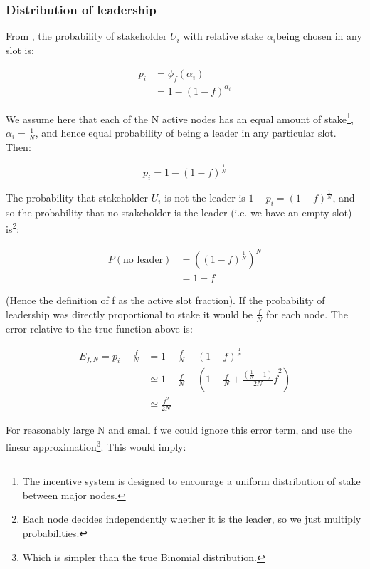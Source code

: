\documentclass[11pt,a4paper]{article}
\begin{document}
\subsubsection{Distribution of leadership}
\label{distribution-of-leadership}

From \cite{BGKR17}, the probability of stakeholder $U_i$
with relative stake $\alpha_{i}$being chosen in any slot is:

\begin{align*}
p_{i} &= \phi_{f}(\alpha_{i}) \\
      &= 1 - (1 - f)^{\alpha_{i}}
\end{align*}

We assume here that each of the N active nodes has an equal amount of
stake\footnote{The incentive system is designed to encourage a uniform
 distribution of stake between major nodes.},
$\alpha_{i} = \frac{1}{N}$, and hence equal probability of being a
leader in any particular slot. Then:

\begin{equation*}
p_i = 1 - (1 - f)^\frac{1}{N}
\end{equation*}

The probability that stakeholder $U_i$ is not the leader is
$1 - p_{i} = (1 - f)^\frac{1}{N}$, and so the
probability that no stakeholder is the leader (i.e. we have an empty
slot) is\footnote{Each node decides independently whether it is the
  leader, so we just multiply probabilities.}:

\begin{align*}
P(\text{no\ leader}) &= \left( (1 - f)^{\frac{1}{N}} \right)^{N} \\
                     &= 1 - f
\end{align*}

(Hence the definition of f as the active slot fraction). If the
probability of leadership was directly proportional to stake it would be
$\frac{f}{N}$ for each node. The error relative to the true function
above is:

\begin{align*}
E_{f,N} = p_{i} - \frac{f}{N}
  &= 1 - \frac{f}{N} - (1 - f)^{\frac{1}{N}} \\
  &\simeq 1 - \frac{f}{N} - \left( 1 - \frac{f}{N} + {\frac{(\frac{1}{N} - 1)}{2N}f}^{2} \right) \\
  &\simeq \frac{f^{2}}{2N}
\end{align*}

For reasonably large N and small f we could ignore this error term, and
use the linear approximation\footnote{Which is simpler than the true
  Binomial distribution.}. This would imply:
\end{document}
